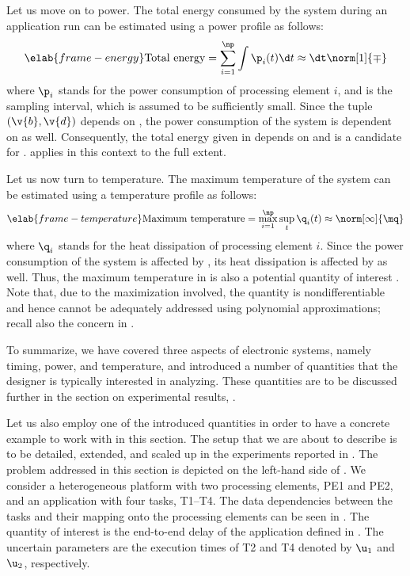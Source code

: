 Let us move on to power. The total energy consumed by the system during an
application run can be estimated using a power profile \mp as follows:
\begin{equation} \elab{frame-energy}
  \text{Total energy}
  = \sum_{i = 1}^\np \int \p_i(t) \d t
  \approx \dt \norm[1]{\mp}
\end{equation}
where $\p_i$ stands for the power consumption of processing element $i$, and \dt
is the sampling interval, which is assumed to be sufficiently small. Since the
tuple $(\v{b}, \v{d})$ depends on \vu, the power consumption of the system is
dependent on \vu as well. Consequently, the total energy given in
 depends on \vu and is a candidate for \g.
 applies in this context to the full extent.

Let us now turn to temperature. The maximum temperature of the system can be
estimated using a temperature profile \mq as follows:
\begin{equation} \elab{frame-temperature}
  \text{Maximum temperature}
  = \max_{i = 1}^\np \sup_{t} \q_i(t)
  \approx \norm[\infty]{\mq}
\end{equation}
where $\q_i$ stands for the heat dissipation of processing element $i$. Since
the power consumption of the system is affected by \vu, its heat dissipation is
affected by \vu as well. Thus, the maximum temperature in
 is also a potential quantity of interest \g. Note that,
due to the maximization involved, the quantity is nondifferentiable and hence
cannot be adequately addressed using polynomial approximations; recall also the
concern in .

To summarize, we have covered three aspects of electronic systems, namely
timing, power, and temperature, and introduced a number of quantities that the
designer is typically interested in analyzing. These quantities are to be
discussed further in the section on experimental results, .

Let us also employ one of the introduced quantities in order to have a concrete
example to work with in this section. The setup that we are about to describe is
to be detailed, extended, and scaled up in the experiments reported in
. The problem addressed in this section is depicted on the
left-hand side of . We consider a heterogeneous platform
with two processing elements, PE1 and PE2, and an application with four tasks,
T1--T4. The data dependencies between the tasks and their mapping onto the
processing elements can be seen in . The quantity of
interest \g is the end-to-end delay of the application defined in
. The uncertain parameters \vu are the execution times of T2
and T4 denoted by $\u_1$ and $\u_2$, respectively.

